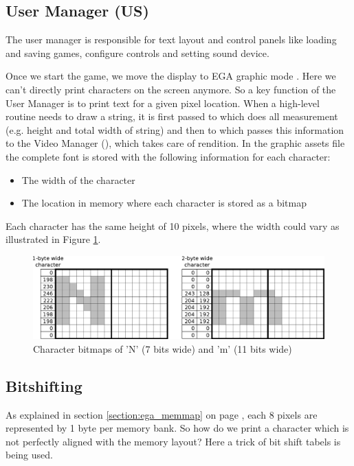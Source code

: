 \documentclass[book.tex]{subfiles}
\begin{document}
\par

\par
 
 
 
\subsection{User Manager (US)} 
The user manager is responsible for text layout and control panels like loading and saving games, configure controls and setting sound device.\\
\par

Once we start the game, we move the display to EGA graphic mode . Here we can't directly print characters on the screen anymore. So a key function of the User Manager is to print text for a given pixel location. When a high-level routine needs to draw a string, it is first passed to  which does all measurement (e.g. height and total width of string) and then to  which passes this information to the Video Manager (), which takes care of rendition.
In the graphic assets file the complete font is stored with the following information for each character:
\begin{itemize}
  \item The width of the character
  \item The location in memory where each character is stored as a bitmap
\end{itemize}
Each character has the same height of 10 pixels, where the width could vary as illustrated in Figure \ref{fig:text_bitmap}. 
\begin{figure}[H]
\centering
 \includegraphics[width=\textwidth]{imgs/drawings/text_bitmap.eps}
 \caption{Character bitmaps of 'N' (7 bits wide) and 'm' (11 bits wide)}
 \label{fig:text_bitmap}
 \end{figure}
 \par
 
\subsection{Bitshifting}
\label{section:bitshifting}
As explained in section \ref{section:ega_memmap} on page \pageref{section:ega_memmap}, each 8 pixels are represented by 1 byte per memory bank. So how do we print a character which is not perfectly aligned with the memory layout? Here a trick of bit shift tabels is being used. \\
\par
\end{document}
